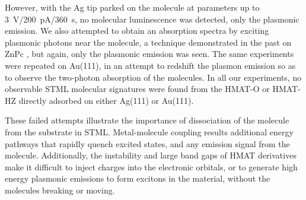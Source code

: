 However, with the Ag tip parked on the molecule at parameters up to \SI{3}{V}/\SI{200}{pA}/\SI{360}{s}, no molecular luminescence was detected, only the plasmonic emission. We also attempted to obtain an absorption spectra by exciting plasmonic photons near the molecule, a technique demonstrated in the past on ZnPc \cite{zhang2017sub}, but again, only the plasmonic emission was seen. The same experiments were repeated on Au(111), in an attempt to redshift the plasmon emission so as to observe the two-photon absorption of the molecules. In all our experiments, no observable \ac{STML} molecular signatures were found from the HMAT-O or HMAT-HZ directly adsorbed on either Ag(111) or Au(111). 

These failed attempts illustrate the importance of dissociation of the molecule from the substrate in \ac{STML}. Metal-molecule coupling results additional energy pathways that rapidly quench excited states, and any emission signal from the molecule. Additionally, the instability and large band gaps of \ac{HMAT} derivatives make it difficult to inject charges into the electronic orbitals, or to generate high energy plasmonic emissions to form excitons in the material, without the molecules breaking or moving. 




